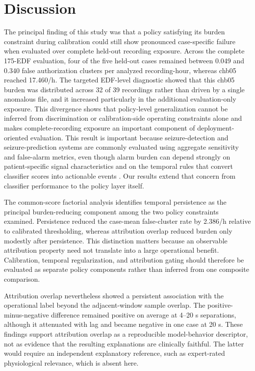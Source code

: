\documentclass[11pt,a4paper]{article}
\begin{document}
\section{Discussion}
The principal finding of this study was that a policy satisfying its burden constraint during calibration could still show pronounced case-specific failure when evaluated over complete held-out recording exposure. Across the complete 175-EDF evaluation, four of the five held-out cases remained between 0.049 and 0.340 false authorization clusters per analyzed recording-hour, whereas chb05 reached 17.460/h. The targeted EDF-level diagnostic showed that this chb05 burden was distributed across 32 of 39 recordings rather than driven by a single anomalous file, and it increased particularly in the additional evaluation-only exposure. This divergence shows that policy-level generalization cannot be inferred from discrimination or calibration-side operating constraints alone and makes complete-recording exposure an important component of deployment-oriented evaluation. This result is important because seizure-detection and seizure-prediction systems are commonly evaluated using aggregate sensitivity and false-alarm metrics, even though alarm burden can depend strongly on patient-specific signal characteristics and on the temporal rules that convert classifier scores into actionable events \citep{andrade2024samplealarm,batista2024postprocessing,ingolfsson2024artifact}. Our results extend that concern from classifier performance to the policy layer itself.

The common-score factorial analysis identifies temporal persistence as the principal burden-reducing component among the two policy constraints examined. Persistence reduced the case-mean false-cluster rate by 2.386/h relative to calibrated thresholding, whereas attribution overlap reduced burden only modestly after persistence. This distinction matters because an observable attribution property need not translate into a large operational benefit. Calibration, temporal regularization, and attribution gating should therefore be evaluated as separate policy components rather than inferred from one composite comparison.

Attribution overlap nevertheless showed a persistent association with the operational label beyond the adjacent-window sample overlap. The positive-minus-negative difference remained positive on average at 4--20 s separations, although it attenuated with lag and became negative in one case at 20 s. These findings support attribution overlap as a reproducible model-behavior descriptor, not as evidence that the resulting explanations are clinically faithful. The latter would require an independent explanatory reference, such as expert-rated physiological relevance, which is absent here\citep{vieira2023xai,salvi2025uncertainty}.
\end{document}
